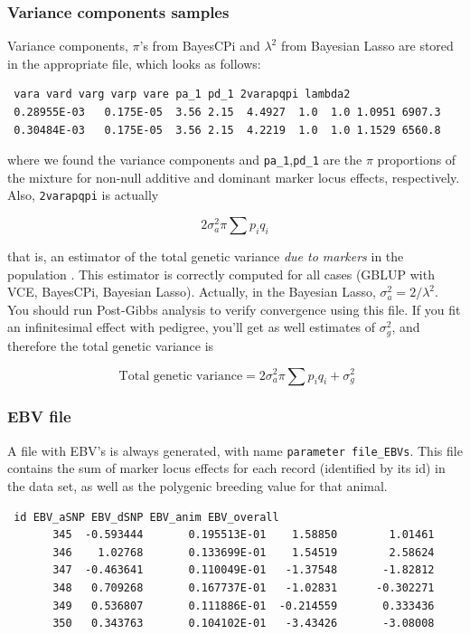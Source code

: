 \documentclass[a4paper,12pt,titlepage]{article}      %
\begin{document}
\subsubsection{Variance components samples}
Variance components, $\pi$'s from BayesCPi and $\lambda^2$ from Bayesian Lasso are stored in the appropriate file, which looks as follows:
{\scriptsize
\begin{verbatim}
 vara vard varg varp vare pa_1 pd_1 2varapqpi lambda2
 0.28955E-03   0.175E-05  3.56 2.15  4.4927  1.0  1.0 1.0951 6907.3
 0.30484E-03   0.175E-05  3.56 2.15  4.2219  1.0  1.0 1.1529 6560.8
\end{verbatim}
}
where we found the variance components and \verb|pa_1|,\verb|pd_1| are the $\pi$ proportions of the mixture for non-null additive and dominant marker locus effects, respectively. Also, \texttt{2varapqpi} is actually

$$2 \sigma^2_a \pi \sum{p_i q_i}$$

that is, an estimator of the total genetic variance \emph{due to markers}  in the population \cite{Gianola2009a}. This estimator is correctly computed for all cases (GBLUP with VCE, BayesCPi, Bayesian Lasso). Actually, in the Bayesian Lasso, $\sigma^2_a=2/\lambda^2$. You should run Post-Gibbs analysis to verify convergence using this file. If you fit an infinitesimal effect with pedigree, you'll get as well estimates of $\sigma^2_g$, and therefore the total genetic variance is 

$$ \text{ Total genetic variance} = 2\sigma^2_a \pi \sum{p_i q_i} + \sigma^2_g $$

\subsubsection{EBV file}
A file with EBV's is always generated, with name \verb|parameter file_EBVs|. This file contains the sum of marker locus effects for each record (identified by its id) in the data set, as well as the polygenic breeding value for that animal.
{\scriptsize
\begin{verbatim}
 id EBV_aSNP EBV_dSNP EBV_anim EBV_overall
       345  -0.593444       0.195513E-01    1.58850        1.01461
       346    1.02768       0.133699E-01    1.54519        2.58624
       347  -0.463641       0.110049E-01   -1.37548       -1.82812
       348   0.709268       0.167737E-01   -1.02831      -0.302271
       349   0.536807       0.111886E-01  -0.214559       0.333436
       350   0.343763       0.104102E-01   -3.43426       -3.08008
 \end{verbatim}
}
\end{document}
